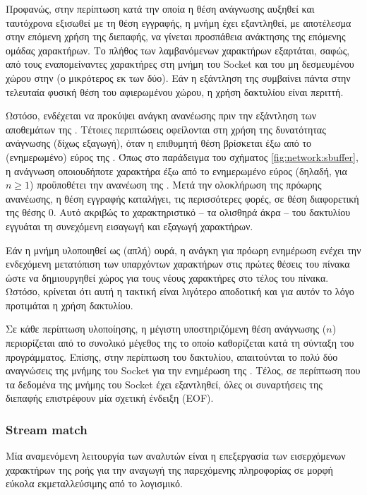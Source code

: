 Προφανώς, στην περίπτωση κατά την οποία η θέση ανάγνωσης αυξηθεί και ταυτόχρονα
εξισωθεί με τη θέση εγγραφής, η μνήμη  έχει εξαντληθεί,
με αποτέλεσμα στην επόμενη χρήση της διεπαφής, να γίνεται προσπάθεια ανάκτησης
της επόμενης ομάδας χαρακτήρων. Το πλήθος των λαμβανόμενων χαρακτήρων εξαρτάται,
σαφώς, από τους εναπομείναντες χαρακτήρες στη μνήμη του Socket και του μη
δεσμευμένου χώρου στην  (ο μικρότερος εκ των δύο). Εάν η εξάντληση της
 συμβαίνει πάντα στην τελευταία φυσική θέση του αφιερωμένου χώρου, η
χρήση δακτυλίου είναι περιττή.

Ωστόσο, ενδέχεται να προκύψει ανάγκη ανανέωσης πριν την εξάντληση των αποθεμάτων
της . Τέτοιες περιπτώσεις οφείλονται στη χρήση της δυνατότητας
ανάγνωσης (δίχως εξαγωγή), όταν η επιθυμητή θέση βρίσκεται έξω από το
(ενημερωμένο) εύρος της . Όπως στο παράδειγμα του σχήματος
\ref{fig:network:sbuffer}, η ανάγνωση οποιουδήποτε χαρακτήρα έξω από το
ενημερωμένο εύρος (δηλαδή, για $n \ge 1$) προϋποθέτει την ανανέωση της
. Μετά την ολοκλήρωση της πρόωρης ανανέωσης, η θέση εγγραφής
καταλήγει, τις περισσότερες φορές, σε θέση διαφορετική της θέσης 0.
Αυτό ακριβώς το χαρακτηριστικό -- τα ολισθηρά άκρα -- του δακτυλίου εγγυάται τη
συνεχόμενη εισαγωγή και εξαγωγή χαρακτήρων.

Εάν η μνήμη  υλοποιηθεί ως (απλή) ουρά, η ανάγκη για πρόωρη ενημέρωση
ενέχει την ενδεχόμενη μετατόπιση των υπαρχόντων χαρακτήρων στις πρώτες θέσεις
του πίνακα ώστε να δημιουργηθεί χώρος για τους νέους χαρακτήρες στο τέλος του
πίνακα. Ωστόσο, κρίνεται ότι αυτή η τακτική είναι λιγότερο αποδοτική και για
αυτόν το λόγο προτιμάται η χρήση δακτυλίου.

Σε κάθε περίπτωση υλοποίησης, η μέγιστη υποστηριζόμενη θέση ανάγνωσης ($n$)
περιορίζεται από το συνολικό μέγεθος της  το οποίο καθορίζεται κατά τη
σύνταξη του προγράμματος. Επίσης, στην περίπτωση του δακτυλίου, απαιτούνται το
πολύ δύο αναγνώσεις της μνήμης του Socket για την ενημέρωση της .
Τέλος, σε περίπτωση που τα δεδομένα της μνήμης του Socket έχει εξαντληθεί, όλες
οι συναρτήσεις της διεπαφής επιστρέφουν μία σχετική ένδειξη (EOF).


\subsubsection{Stream match}
\label{ssubsec:network:stream-match}

Μία αναμενόμενη λειτουργία των αναλυτών είναι η επεξεργασία των εισερχόμενων
χαρακτήρων της ροής για την αναγωγή της παρεχόμενης πληροφορίας σε μορφή εύκολα
εκμεταλλεύσιμης από το λογισμικό.

